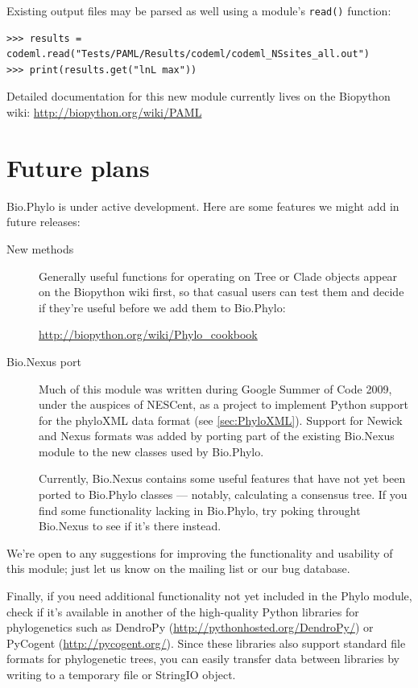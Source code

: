 \documentclass{report}
\begin{document}
Existing output files may be parsed as well using a module's \texttt{read()} function:
\begin{verbatim}
>>> results = codeml.read("Tests/PAML/Results/codeml/codeml_NSsites_all.out")
>>> print(results.get("lnL max"))
\end{verbatim}

Detailed documentation for this new module currently lives on the Biopython wiki:
\url{http://biopython.org/wiki/PAML}

\section{Future plans}
\label{sec:PhyloFuture}

Bio.Phylo is under active development. Here are some features we might add in future
releases:

\begin{description}
  \item[New methods] 
    Generally useful functions for operating on Tree or Clade objects appear on the Biopython
    wiki first, so that casual users can test them and decide if they're useful before we add
    them to Bio.Phylo:

    \url{http://biopython.org/wiki/Phylo_cookbook}

  \item[Bio.Nexus port]
    Much of this module was written during Google Summer of Code 2009, under the auspices of
    NESCent, as a project to implement Python support for the phyloXML data format (see
    \ref{sec:PhyloXML}). Support for Newick and Nexus formats was added by porting part of the
    existing Bio.Nexus module to the new classes used by Bio.Phylo.

    Currently, Bio.Nexus contains some useful features that have not yet been ported to
    Bio.Phylo classes --- notably, calculating a consensus tree. If you find some functionality
    lacking in Bio.Phylo, try poking throught Bio.Nexus to see if it's there instead.

\end{description}

We're open to any suggestions for improving the functionality and usability of this module;
just let us know on the mailing list or our bug database.

Finally, if you need additional functionality not yet included in the Phylo
module, check if it's available in another of the high-quality Python libraries
for phylogenetics such as DendroPy (\url{http://pythonhosted.org/DendroPy/}) or
PyCogent (\url{http://pycogent.org/}). Since these libraries also support
standard file formats for phylogenetic trees, you can easily transfer data
between libraries by writing to a temporary file or StringIO object.
\end{document}

